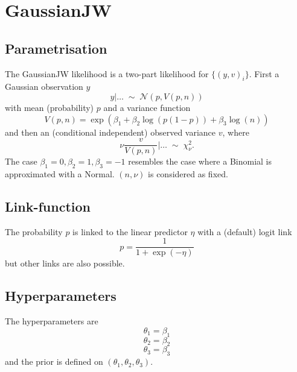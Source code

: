 \documentclass[a4paper,11pt]{article}
\begin{document}
\section*{GaussianJW}

\subsection*{Parametrisation}

The GaussianJW likelihood is a two-part likelihood for $\{(y,v)_i\}$.
First a Gaussian observation $y$
\begin{displaymath}
    y|\ldots  \;\sim\; {\mathcal N}(p, V(p, n)) 
\end{displaymath}
with mean (probability) $p$ and a variance function
\begin{displaymath}
    V(p, n) = \exp\left(\beta_1 + \beta_2 \log(p(1-p)) + \beta_3 \log(n)\right)
\end{displaymath}
and then an (conditional independent) observed variance $v$, where
\begin{displaymath}
    \nu\frac{v}{V(p,n)}|\ldots \;\sim\; \chi^{2}_{\nu}.
\end{displaymath}
The case $\beta_1=0, \beta_2=1, \beta_3=-1$ resembles the case where a
Binomial is approximated with a Normal. $(n,\nu)$ is considered as
fixed.


\subsection*{Link-function}

The probability $p$ is linked to the linear predictor $\eta$ with a
(default) logit link
\begin{displaymath}
    p = \frac{1}{1 + \exp(-\eta)}
\end{displaymath}
but other links are also possible.

\subsection*{Hyperparameters}

The hyperparameters are 
\begin{displaymath}
    \theta_1 = \beta_1
\end{displaymath}
\begin{displaymath}
    \theta_2 = \beta_2
\end{displaymath}
\begin{displaymath}
    \theta_3 = \beta_3
\end{displaymath}
and the prior is defined on $(\theta_1, \theta_2, \theta_3)$.
\end{document}
